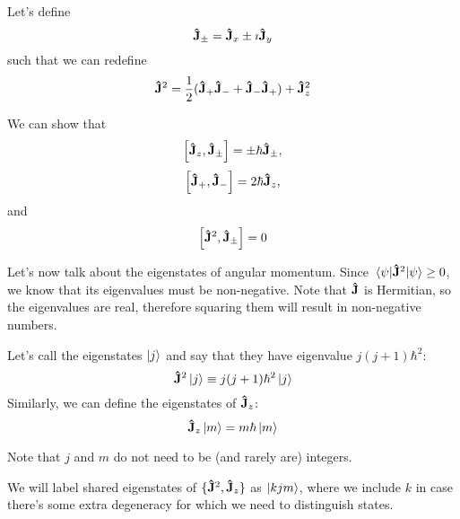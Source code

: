 \documentclass[a4paper,twoside,master.tex]{subfiles}
\begin{document}
Let's define
\begin{equation}
    \vu{J}_{\pm} = \vu{J}_x \pm \imath \vu{J}_y
\end{equation}
such that we can redefine
\begin{equation}
    \vu{J}^2 = \frac{1}{2} ( \vu{J}_+ \vu{J}_- + \vu{J}_- \vu{J}_+) + \vu{J}_z^2
\end{equation}

We can show that
\begin{equation}
    \comm{ \vu{J}_z}{ \vu{J}_{\pm}} = \pm \hbar \vu{J}_{\pm},
\end{equation}
\begin{equation}
    \comm{ \vu{J}_+}{ \vu{J}_-} = 2 \hbar \vu{J}_z, 
\end{equation}
and
\begin{equation}
    \comm{ \vu{J}^2}{ \vu{J}_{\pm}} = 0
\end{equation}

Let's now talk about the eigenstates of angular momentum. Since $ \ev{ \vu{J}^2}{\psi} \geq 0 $, we know that its eigenvalues must be non-negative. Note that $ \vu{J} $ is Hermitian, so the eigenvalues are real, therefore squaring them will result in non-negative numbers.

Let's call the eigenstates $\ket{j} $ and say that they have eigenvalue $ j(j+1) \hbar^2 $:
\begin{equation}
    \vu{J}^2\ket{j} \equiv j(j+1) \hbar^2\ket{j}
\end{equation}
Similarly, we can define the eigenstates of $ \vu{J}_z $:
\begin{equation}
    \vu{J}_z\ket{m} = m \hbar\ket{m}
\end{equation}

Note that $ j $ and $ m $ do not need to be (and rarely are) integers.

We will label shared eigenstates of $ \{ \vu{J}^2, \vu{J}_z\} $ as $\ket{kjm} $, where we include $ k $ in case there's some extra degeneracy for which we need to distinguish states.
\end{document}

